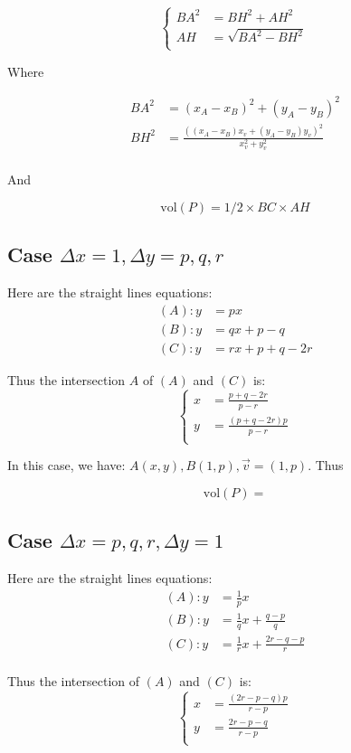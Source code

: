 \documentclass[a4paper]{article}
\begin{document}
$$
\left\{
  \begin{aligned}
    BA^2 &= BH^2 + AH^2 \\
    AH &= \sqrt{BA^2 - BH^2} \\
  \end{aligned}
\right.
$$

Where

$$
\begin{aligned}
    BA^2 &= (x_A-x_B)^2 + (y_A-y_B)^2 \\
    BH^2 &= \frac{((x_A-x_B)x_v + (y_A-y_B)y_v)^2}{x_v^2 + y_v^2} \\
\end{aligned}
$$

And

$$
\mathrm{vol}(P) = 1/2 \times BC \times AH
$$

\subsection{Case $\Delta x = 1, \Delta y = p,q,r$}
Here are the straight lines equations:
\begin{equation}
  \begin{aligned}
    (A): y  &= px \\
    (B): y  &= qx + p - q \\
    (C): y  &= rx + p + q - 2r
  \end{aligned}
\end{equation}

Thus the intersection $A$ of $(A)$ and $(C)$ is:
\begin{equation}
\left\{
\begin{aligned}
  x &= \frac{p + q - 2r}{p - r} \\
  y &= \frac{(p + q - 2r)p}{p - r} \\
\end{aligned}
\right.
\end{equation}

In this case, we have: $A(x,y), B(1,p), \vec{v}=(1,p)$. Thus

\begin{equation}
  \mathrm{vol}(P) =
\end{equation}




\subsection{Case $\Delta x = p,q,r, \Delta y = 1$}
Here are the straight lines equations:
\begin{equation}
  \begin{aligned}
    (A): y  &= \frac{1}{p}x \\
    (B): y  &= \frac{1}{q}x + \frac{q-p}{q} \\
    (C): y  &= \frac{1}{r}x + \frac{2r-q-p}{r} \\
  \end{aligned}
\end{equation}

Thus the intersection of $(A)$ and $(C)$ is:
\begin{equation}
\left\{
\begin{aligned}
  x &= \frac{(2r-p-q)p}{r-p} \\
  y &= \frac{2r-p-q}{r-p} \\
\end{aligned}
\right.
\end{equation}





\end{document}

